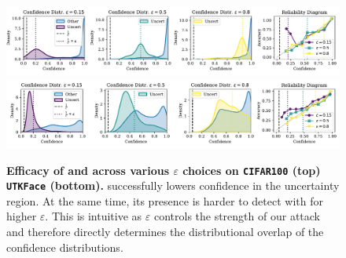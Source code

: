 \begin{figure}[t]
    \centering
    \includegraphics[width=\linewidth]{figs/confidential_guardian/cifar100_eps_abl.pdf}
    \includegraphics[width=\linewidth]{figs/confidential_guardian/utkface_eps_abl.pdf}
    \caption[Efficacy of \attack and \name across various $\varepsilon$ choices on \texttt{CIFAR100} (top) \texttt{UTKFace} (bottom).]{\textbf{Efficacy of \attack and \name across various $\varepsilon$ choices on \texttt{CIFAR100} (top) \texttt{UTKFace} (bottom).} \attack successfully lowers confidence in the uncertainty region. At the same time, its presence is harder to detect with \name for higher $\varepsilon$. This is intuitive as $\varepsilon$ controls the strength of our attack and therefore directly determines the distributional overlap of the confidence distributions.}
    \label{fig:eps_abl}
\end{figure}

